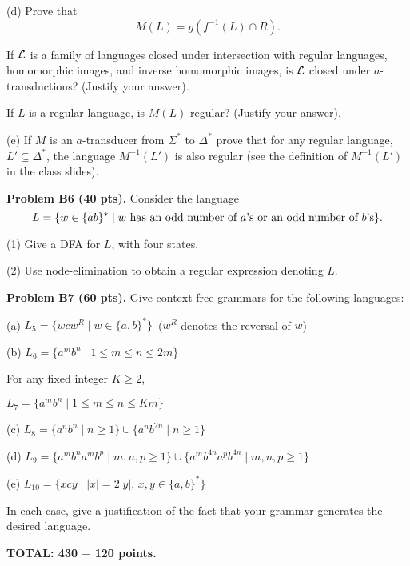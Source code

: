 \documentclass[12pt]{article}
\begin{document}
\medskip
(d) Prove that
$$M(L) = g(f^{-1}(L)\cap R).$$

\medskip
If ${\cal L}$ is a family of languages closed under
intersection with regular languages, homomorphic images,
and inverse homomorphic images, is ${\cal L}$ closed
under $a$-transductions? (Justify your answer).

\medskip
If $L$ is a regular language, is $M(L)$ regular?
(Justify your answer).

\medskip
(e)
If $M$ is an $a$-transducer from $\Sigma^*$ to $\Delta^*$ prove that
for any regular language, $L'\subseteq \Delta^*$, the language
$M^{-1}(L')$ is also regular (see the definition of $M^{-1}(L')$
in the class slides).

\vspace{0.25cm}\noindent
{\bf Problem B6 (40 pts).} 
Consider the language
\[
L = \{w\in \{a b\}^* \mid \hbox{$w$ has an odd number of $a$'s or an
  odd number of $b$'s}\}.
\]

\medskip
(1)
Give a DFA for $L$, with four states.

\medskip
(2)
Use node-elimination  to obtain a regular expression denoting $L$.


\vspace{0.25cm}\noindent
{\bf Problem B7 (60 pts).} 
Give context-free grammars for the following languages:

\medskip
(a)
$L_{5} = \{wcw^{R}\mid w \in \{a,b\}^{*}\}$\ 
($w^{R}$ denotes the reversal of $w$)

\medskip
(b)
$L_{6} = \{a^{m}b^{n}\mid 1 \leq m \leq n \leq 2m\}$

\medskip
For any fixed integer $K\geq 2$, 

\medskip
$L_{7} = \{a^{m}b^{n}\mid 1 \leq m \leq n \leq Km\}$

\medskip
(c)
$L_{8} = \{a^{n}b^{n}\mid n \geq 1\}\cup \{a^{n}b^{2n}\mid n \geq 1\}$

\medskip
(d)
$L_{9} = \{a^{m}b^{n}a^{m}b^{p}\mid m, n, p \geq 1\}
\cup \{a^{m}b^{4n}a^{p}b^{4n}\mid m, n, p \geq 1\}$

\medskip
(e)
$L_{10} = \{xcy \mid |x| = 2|y|,\, x, y\in \{a, b\}^*\}$

\medskip
In each case, give a justification of the fact that
your grammar generates the desired language.

\vspace{0.5cm}\noindent
{\bf TOTAL:  430 $+$   120 points.}
\end{document}
